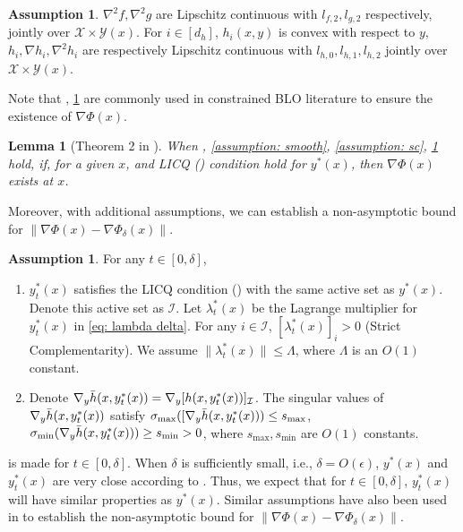 \documentclass{article}
\newcommand{\Ic}{\mathcal{I}}
\newcommand{\Xc}{\mathcal{X}}
\newcommand{\Yc}{\mathcal{Y}}
\theoremstyle{plain}
\newtheorem{lemma}[theorem]{Lemma}
\theoremstyle{definition}
\newtheorem{assumption}[theorem]{Assumption}
\theoremstyle{remark}
\begin{document}
\begin{assumption}\label{assumption: hessian smooth}
$\nabla^2 f, \nabla^2 g$  are Lipschitz continuous with $l_{f,2}, l_{g,2}$ respectively, jointly over $\Xc \times \Yc(x)$.
For $i\in [d_h]$, $h_i(x,y)$ is convex with respect to $y$, $h_i, \nabla h_i, \nabla^2 h_i$ are respectively Lipschitz continuous with $l_{h,0}, l_{h,1}, l_{h,2}$ jointly over $\Xc \times \Yc(x)$.
\end{assumption}

Note that , \ref{assumption: hessian smooth} are commonly used in constrained BLO literature \citep{tsaknakis2022implicit,khanduri2023linearly, xu2023efficient, jiang2024barrier, kwon2023penalty} to ensure the existence of $\nabla \Phi(x)$.


\begin{lemma}[Theorem 2 in \cite{xu2023efficient}]\label{lemma: existence of nabla Phi}
    When , \ref{assumption: smooth}, \ref{assumption: sc}, \ref{assumption: hessian smooth} hold, if, for a given $x$,  and   LICQ () condition hold for $y^*(x)$, then $\nabla \Phi(x)$ exists at $x$.
\end{lemma}



Moreover, with additional assumptions, we can establish a non-asymptotic bound for $\|\nabla \Phi(x)-\nabla \Phi_\delta(x)\|$.

\begin{assumption}\label{assumption: delta}
    For any $t\in [0, \delta]$, 
    \begin{enumerate}[noitemsep,topsep=0pt]
  \item[(1)] $y^*_t(x)$ satisfies the LICQ  condition ()  with the same active set as $y^*(x)$. Denote this active set as $\Ic$. Let $\lambda^*_t(x)$  be the Lagrange multiplier for $y^*_t(x)$ in \eqref{eq: lambda delta}. For any $i\in \Ic$, $[\lambda^*_t(x)]_i > 0$ (Strict Complementarity). We assume $\|\lambda^*_t(x)\|\leq \Lambda$, where $\Lambda$ is an $O(1)$ constant.
    \item[(2)] Denote $\nabla_y \Bar{h}(x,y^*_t(x))=\nabla_y [h(x,y^*_t(x))]_{\Ic}$. The singular values of $\nabla_y \Bar{h}(x,y^*_t(x))$ satisfy $\sigma_{\max}([\nabla_y \Bar{h}(x,y^*_t(x)))\leq s_{\max}$, $\sigma_{\min}(\nabla_y \Bar{h}(x,y^*_t(x)))\geq s_{\min}>0$, where $s_{\max}, s_{\min}$ are $O(1)$ constants. 
\end{enumerate}
\end{assumption}
 is made for $t\in [0, \delta]$.  When $\delta$ is sufficiently small, i.e., $\delta=O(\epsilon)$, $y^*(x)$ and $y^*_t(x)$ are very close according to . Thus, we expect that for $t\in [0, \delta]$, $y^*_t(x)$ will have similar properties as $y^*(x)$. Similar assumptions have also been used in \cite{kwon2023penalty} to establish the non-asymptotic bound for $\|\nabla \Phi(x)-\nabla \Phi_\delta(x)\|$.
\end{document}
